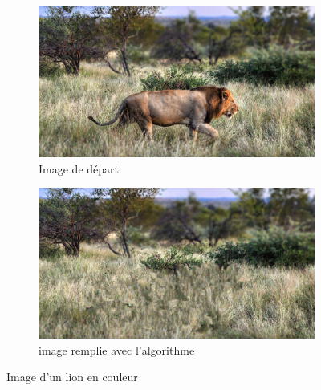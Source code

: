 \documentclass[9pt]{extarticle}
\begin{document}
\begin{figure}[h]
    \centering
    \begin{subfigure}{0.4\textwidth}
        \centering
        \includegraphics[width=\textwidth]{images/lion.png}
        \caption{Image de départ}
    \end{subfigure}
    \hfill
    \begin{subfigure}{0.4\textwidth}
        \centering
        \includegraphics[width=\textwidth]{images/lion_inpaint.png}
        \caption{image remplie avec l'algorithme}
    \end{subfigure}
    \caption{Image d'un lion en couleur}
    \label{fig:lion}
\end{figure}
\end{document}
